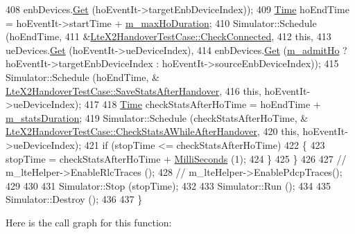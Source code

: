 \begin{DoxyCode}
408                                     enbDevices.\hyperlink{classns3_1_1NetDeviceContainer_a677d62594b5c9d2dea155cc5045f4d0b}{Get} (hoEventIt->targetEnbDeviceIndex));
409       \hyperlink{classns3_1_1Time}{Time} hoEndTime = hoEventIt->startTime + \hyperlink{classLteX2HandoverTestCase_acae0303890a3af28ee8a30c6528c7dfc}{m\_maxHoDuration};
410       Simulator::Schedule (hoEndTime, 
411                            &\hyperlink{classLteX2HandoverTestCase_a60447eff6ec472a1637e479638cc0f83}{LteX2HandoverTestCase::CheckConnected}, 
412                            \textcolor{keyword}{this}, 
413                            ueDevices.\hyperlink{classns3_1_1NetDeviceContainer_a677d62594b5c9d2dea155cc5045f4d0b}{Get} (hoEventIt->ueDeviceIndex), 
414                            enbDevices.\hyperlink{classns3_1_1NetDeviceContainer_a677d62594b5c9d2dea155cc5045f4d0b}{Get} (\hyperlink{classLteX2HandoverTestCase_ab4ea238434f2750bde6a599448968c81}{m\_admitHo} ? hoEventIt->targetEnbDeviceIndex : 
      hoEventIt->sourceEnbDeviceIndex));
415       Simulator::Schedule (hoEndTime, &
      \hyperlink{classLteX2HandoverTestCase_abf950764cf8a00bff9999d30413812db}{LteX2HandoverTestCase::SaveStatsAfterHandover},
416                            \textcolor{keyword}{this}, hoEventIt->ueDeviceIndex);
417 
418       \hyperlink{classns3_1_1Time}{Time} checkStatsAfterHoTime = hoEndTime + \hyperlink{classLteX2HandoverTestCase_a3ddcbe6ad49c9ec5ead6c12f830c350f}{m\_statsDuration};
419       Simulator::Schedule (checkStatsAfterHoTime, &
      \hyperlink{classLteX2HandoverTestCase_ad9f1588abf6c25b126b537839095b68a}{LteX2HandoverTestCase::CheckStatsAWhileAfterHandover}, 
420                            \textcolor{keyword}{this}, hoEventIt->ueDeviceIndex);      
421       \textcolor{keywordflow}{if} (stopTime <= checkStatsAfterHoTime)
422         \{
423           stopTime = checkStatsAfterHoTime + \hyperlink{group__timecivil_gaf26127cf4571146b83a92ee18679c7a9}{MilliSeconds} (1);
424         \}
425     \}
426   
427   \textcolor{comment}{// m\_lteHelper->EnableRlcTraces ();}
428   \textcolor{comment}{// m\_lteHelper->EnablePdcpTraces();}
429 
430  
431   Simulator::Stop (stopTime);
432 
433   Simulator::Run ();
434 
435   Simulator::Destroy ();
436 
437 \}
\end{DoxyCode}


Here is the call graph for this function\+:


